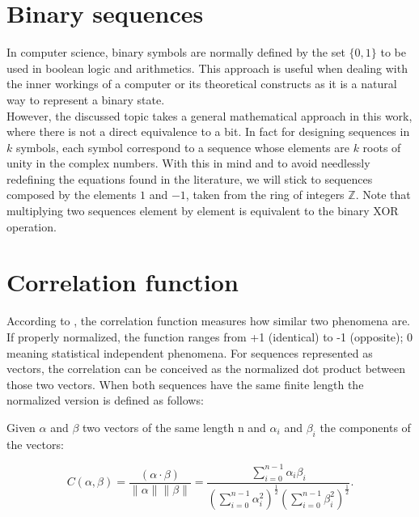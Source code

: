 \section{Binary sequences}

In computer science, binary symbols are normally defined by the set $\{0, 1\}$ to
be used in boolean logic and arithmetics. This approach is useful when dealing
with the inner workings of a computer or its theoretical constructs as it is a natural way to represent a binary state.\\

However, the discussed topic takes a general mathematical approach in this work, where there is not a direct equivalence to a bit.
In fact for designing sequences in $k$ symbols, each symbol correspond to a sequence whose elements are $k$ roots of unity in the complex numbers.
With this in mind and to avoid  needlessly redefining the equations found in the literature, we will stick to sequences composed by the elements
$1$ and $-1$, taken from the ring of integers $\mathbb{Z}$. Note that multiplying two sequences element by element is equivalent to the binary XOR operation.

\section{Correlation function}

According to \citet{golomb_ref}, the correlation function measures how similar
two phenomena are. If properly normalized, the function ranges from
+1 (identical) to -1 (opposite); 0 meaning statistical independent phenomena.
For sequences represented as vectors, the correlation can be conceived
as the normalized dot product between those two vectors.
When both sequences have the same finite length the normalized version is defined as follows:

\begin{definition}\label{def:1}

Given $\alpha$ and $\beta$ two vectors of the same length n and $\alpha_{i}$
and $\beta_{i}$ the components of the vectors:

\begin{equation}\label{eq:1}
C(\alpha , \beta)=\frac{(\alpha \cdot  \beta)}{\|\alpha\|\|\beta\|}=\frac{\sum_{i=0}^{n-1} \alpha_{i}\beta_{i}}{(\sum_{i=0}^{n-1} \alpha_{i}^{2})^{\frac{1}{2}}(\sum_{i=0}^{n-1} \beta_{i}^{2})^\frac{1}{2}}.
\end{equation}
\end{definition}

